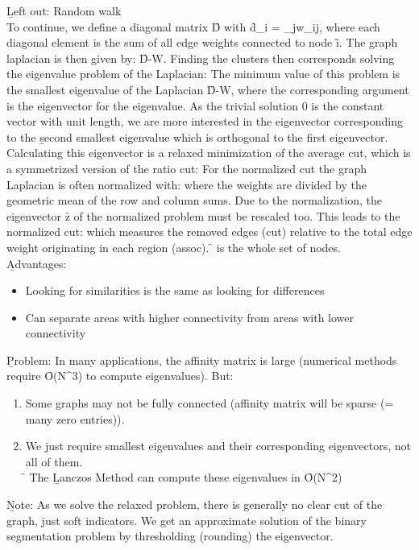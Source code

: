 \b{Left out: Random walk}\\

To continue, we define a diagonal matrix \f{D} with \f{d_i = \sum_jw_{ij}}, where each diagonal element is the sum of all edge weights connected to node \f{i}. The graph laplacian is then given by: \f{D-W}. Finding the clusters then corresponds solving the eigenvalue problem of the Laplacian:
The minimum value of this problem is the smallest eigenvalue of the Laplacian \f{D-W}, where the corresponding argument is the eigenvector for the eigenvalue. As the trivial solution 0 is the constant vector with unit length, we are more interested in the eigenvector corresponding to the \b{second smallest eigenvalue} which is orthogonal to the first eigenvector.\\
Calculating this eigenvector is a relaxed minimization of the average cut, which is a symmetrized version of the ratio cut:
For the normalized cut the graph Laplacian is often normalized with:
where the weights are divided by the geometric mean of the row and column sums. Due to the normalization, the eigenvector \f{z} of the normalized problem must be rescaled too. This leads to the normalized cut:
which measures the removed edges (cut) relative to the total edge weight originating in each region (assoc). \f{\Omega} is the whole set of nodes.\\

\b{Advantages:}
\begin{itemize}
    \item Looking for similarities is the same as looking for differences
    \item Can separate areas with higher connectivity from areas with lower connectivity
\end{itemize}
\vspace{0.5em}
\b{Problem:} In many applications, the affinity matrix is large (numerical methods require \f{O(N^3)} to compute eigenvalues). But:
\begin{enumerate}
    \item Some graphs may not be fully connected (affinity matrix will be sparse (= many zero entries)).
    \item We just require smallest eigenvalues and their corresponding eigenvectors, not all of them.\\
    \f{\to} The \b{Lanczos Method} can compute these eigenvalues in \f{O(N^2)}
\end{enumerate}
\vspace{0.5em}
\b{Note:} As we solve the relaxed problem, there is generally no clear cut of the graph, just soft indicators. We get an approximate solution of the binary segmentation problem by thresholding (rounding) the eigenvector.\\


